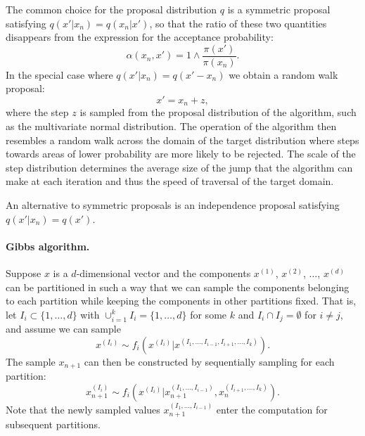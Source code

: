 \documentclass[11pt,a4paper]{report}
\begin{document}

The common choice for the proposal distribution $q$ is a symmetric proposal satisfying $q(x'|x_n) = q(x_n|x')$, so that the ratio of these two quantities disappears from the expression for the acceptance probability:
$$\alpha(x_n, x') = 1 \wedge \frac{\pi(x')}{\pi(x_n)}.$$
In the special case where $q(x'|x_n) = q(x' - x_n)$ we obtain a random walk proposal:
$$x' = x_n + z,$$
where the step $z$ is sampled from the proposal distribution of the algorithm, such as the multivariate normal distribution. The operation of the algorithm then resembles a random walk across the domain of the target distribution where steps towards areas of lower probability are more likely to be rejected. The scale of the step distribution determines the average size of the jump that the algorithm can make at each iteration and thus the speed of traversal of the target domain.

An alternative to symmetric proposals is an independence proposal satisfying $q(x'|x_n) = q(x')$.


\paragraph{Gibbs algorithm.} Suppose $x$ is a $d$-dimensional vector and the components $x^{(1)}$, $x^{(2)}$, $\dots$, $x^{(d)}$ can be partitioned in such a way that we can sample the components belonging to each partition while keeping the components in other partitions fixed. That is, let $I_i \subset \{1, \dots, d\}$ with $\cup_{i=1}^k I_i = \{1, \dots, d\}$ for some $k$ and $I_i \cap I_j = \emptyset$ for $i \neq j$, and assume we can sample
$$x^{(I_i)} \sim f_i\left(x^{(I_i)} | x^{(I_1, \dots, I_{i-1}, I_{i+1}, \dots, I_k)}\right).$$
The sample $x_{n+1}$ can then be constructed by sequentially sampling for each partition:
$$x_{n+1}^{(I_i)} \sim f_i\left(x^{(I_i)} | x_{n+1}^{(I_1, \dots, I_{i-1})}, x_n^{(I_{i+1}, \dots, I_k)}\right).$$
Note that the newly sampled values $x_{n+1}^{(I_1, \dots, I_{i-1})}$ enter the computation for subsequent partitions.


\end{document}
